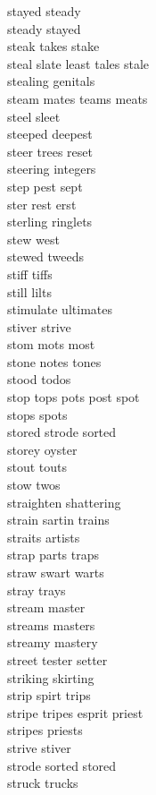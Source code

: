 stayed steady\\
steady stayed\\
steak takes stake\\
steal slate least tales stale\\
stealing genitals\\
steam mates teams meats\\
steel sleet\\
steeped deepest\\
steer trees reset\\
steering integers\\
step pest sept\\
ster rest erst\\
sterling ringlets\\
stew west\\
stewed tweeds\\
stiff tiffs\\
still lilts\\
stimulate ultimates\\
stiver strive\\
stom mots most\\
stone notes tones\\
stood todos\\
stop tops pots post spot\\
stops spots\\
stored strode sorted\\
storey oyster\\
stout touts\\
stow twos\\
straighten shattering\\
strain sartin trains\\
straits artists\\
strap parts traps\\
straw swart warts\\
stray trays\\
stream master\\
streams masters\\
streamy mastery\\
street tester setter\\
striking skirting\\
strip spirt trips\\
stripe tripes esprit priest\\
stripes priests\\
strive stiver\\
strode sorted stored\\
struck trucks\\
